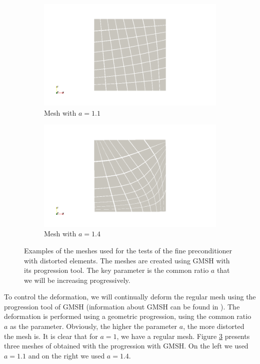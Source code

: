 \begin{figure}
\centering
\begin{subfigure}{.5\textwidth}
  \centering
  \includegraphics[width=1.2\linewidth]{Results/fine_mesh_deform_1.png}
  \caption{Mesh with $a=1.1$}
  \label{fine_mesh_deform_1}
\end{subfigure}%
\begin{subfigure}{.5\textwidth}
  \centering
  \includegraphics[width=1.2\linewidth]{Results/fine_mesh_deform_2.png}
  \caption{Mesh with $a=1.4$}
  \label{fine_mesh_deform_2}
\end{subfigure}
\caption{Examples of the meshes used for the tests of the fine preconditioner with distorted elements. The meshes are created using GMSH with its progression tool. The key parameter is the common ratio $a$ that we will be increasing progressively.}
\label{fine_mesh_deform}
\end{figure}

To control the deformation, we will continually deform the regular mesh using the progression tool of GMSH (information about GMSH can be found in \cite{gmsh}). The deformation is performed using a geometric progression, using the common ratio $a$ as the parameter. Obviously, the higher the parameter $a$, the more distorted the mesh is. It is clear that for $a=1$, we have a regular mesh. Figure \ref{fine_mesh_deform} presents three meshes of obtained with the progression with GMSH. On the left we used $a = 1.1$ and on the right we used $a=1.4$. 

